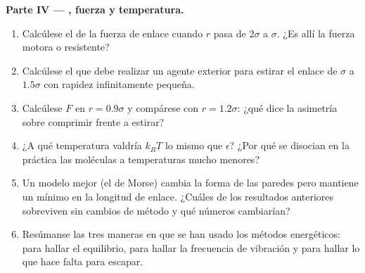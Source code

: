 \begin{problem}
\medskip
\noindent\textbf{Parte IV --- , fuerza y temperatura.}
\begin{enumerate}[resume]
  \item Calcúlese el  de la fuerza de enlace cuando $r$ pasa de
        $2\sigma$ a $\sigma$. ¿Es allí la fuerza motora o resistente?
  \item Calcúlese el  que debe realizar un agente exterior para
        estirar el enlace de $\sigma$ a $1.5\sigma$ con rapidez
        infinitamente pequeña.
  \item Calcúlese $F$ en $r = 0.9\sigma$ y compárese con $r = 1.2\sigma$:
        ¿qué dice la asimetría sobre comprimir frente a estirar?
  \item ¿A qué temperatura valdría $k_BT$ lo mismo que $\epsilon$? ¿Por
        qué se disocian en la práctica las moléculas a temperaturas mucho
        menores?
  \item Un modelo mejor (el de Morse) cambia la forma de las paredes pero
        mantiene un mínimo en la longitud de enlace. ¿Cuáles de los
        resultados anteriores sobreviven sin cambios de método y qué
        números cambiarían?
  \item Resúmanse las tres maneras en que se han usado los métodos
        energéticos: para hallar el equilibrio, para hallar la frecuencia
        de vibración y para hallar lo que hace falta para escapar.
\end{enumerate}
\end{problem}
